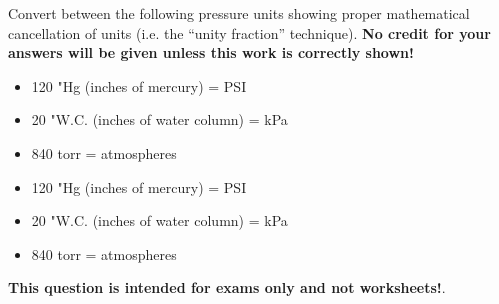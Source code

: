 

Convert between the following pressure units showing proper mathematical cancellation of units (i.e. the ``unity fraction'' technique).  {\bf No credit for your answers will be given unless this work is correctly shown!}

\begin{itemize}
\item{} 120 "Hg (inches of mercury) = \underbar{\hskip 50pt} PSI
\item{} 20 "W.C. (inches of water column) = \underbar{\hskip 50pt} kPa
\item{} 840 torr = \underbar{\hskip 50pt} atmospheres
\end{itemize}







\begin{itemize}
\item{} 120 "Hg (inches of mercury) =  PSI
\item{} 20 "W.C. (inches of water column) =  kPa
\item{} 840 torr =  atmospheres
\end{itemize}







{\bf This question is intended for exams only and not worksheets!}.



